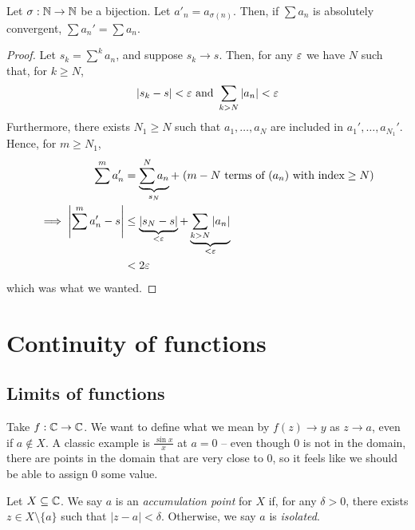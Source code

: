 \documentclass{../template/note}
\begin{document}
    \begin{proposition}
        Let \(\sigma: \mathbb N \to \mathbb N\) be a bijection. Let \(a'_n = a_{\sigma(n)}\). Then, if \(\sum a_n\) is absolutely convergent, \(\sum a_n' = \sum a_n\).        
    \end{proposition}
    
    \begin{proof}
        Let \(s_k = \sum^k a_n\), and suppose \(s_k \to s\). Then, for any \(\varepsilon\) we have \(N\) such that, for \(k \geq N\),
        \begin{align*}
            |s_k - s| < \varepsilon \text{ and } \sum_{k > N} |a_n| < \varepsilon
        \end{align*}
        Furthermore, there exists \(N_1 \geq N\) such that \(a_1, \dots, a_N\) are included in \(a_1', \dots, a_{N_1}'\). Hence, for \(m \geq N_1\), 
        \begin{align*}
            \sum^m a_n' &= \underbrace{\sum^N a_n}_{s_N} + \;(m-N\text{ terms of }(a_n)\text{ with index}\geq N) \\
            \implies \left|\sum^m a_n'-s\right| &\leq \underbrace{|s_N - s|}_{<\varepsilon} + \underbrace{\sum_{k > N}|a_n|}_{<\varepsilon} \\
            &< 2\varepsilon
        \end{align*}
        which was what we wanted.
    \end{proof}
    
    \section{Continuity of functions}

    \subsection{Limits of functions}

    Take \(f: \mathbb C \to \mathbb C\). We want to define what we mean by \(f(z) \to y\) as \(z \to a\), even if \(a \notin X\). A classic example is \(\frac{\sin x}{x}\) at \(a=0\) -- even though 0 is not in the domain, there are points in the domain that are very close to 0, so it feels like we should be able to assign 0 some value.

    \begin{definition}
        Let \(X \subseteq \mathbb C\). We say \(a\) is an \emph{accumulation point} for \(X\) if, for any \(\delta > 0\), there exists \(z \in X \setminus \{a\}\) such that \(|z-a| < \delta\). Otherwise, we say \(a\) is \emph{isolated}.
    \end{definition}
    
\end{document}

